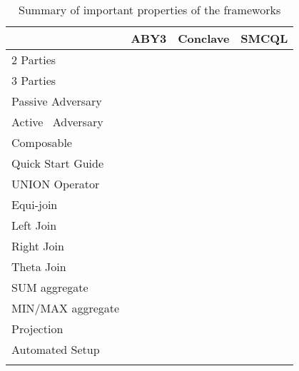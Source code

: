 \begin{table}[H]
	\label{Summary}	
	\centering
	\caption{Summary of important properties of the frameworks}
	\begin{tabular}{|l|l|l|l|} 
		\hline
		& ABY3                 & Conclave             & SMCQL                 \\ 
		\hline
		2 Parties            & \xmark                 & \bluecheck                 & \bluecheck                  \\ 
		\hline
		3 Parties            & \bluecheck                  & \bluecheck                 & \xmark                    \\ 
		\hline
		Passive Adversary    & \bluecheck                & \bluecheck                & \bluecheck                 \\ 
		\hline
		Active~ Adversary    & \xmark                   & \xmark                   & \xmark                    \\ 
		\hline
		Composable           & \bluecheck               & \bluecheck                 & \xmark                    \\ 
		\hline
		Quick Start Guide    & \bluecheck                & \bluecheck                & \xmark                    \\ 
		\hline
		UNION Operator       & \bluecheck                 & \bluecheck                & \bluecheck                  \\ 
		\hline
		Equi-join            & \bluecheck                 & \bluecheck                & \bluecheck                 \\ 
		\hline
		Left Join            & \bluecheck                & \xmark                   & \xmark                    \\ 
		\hline
		Right Join           & \bluecheck                & \xmark                   & \xmark                    \\ 
		\hline
		Theta Join           & \xmark                   & \xmark                   & \bluecheck                  \\ 
		\hline
		SUM aggregate        & \xmark                   & \bluecheck              & \bluecheck                 \\ 
		\hline
		MIN/MAX aggregate    & \xmark                   & \xmark                   & \bluecheck                 \\ 
		\hline
		Projection           & \xmark                  & \bluecheck                 & \bluecheck                \\ 
		\hline
		Automated Setup           & \bluecheck                   & \xmark                  & \xmark                   \\ 
		\hline
		
		\multicolumn{1}{l}{} & \multicolumn{1}{l}{} & \multicolumn{1}{l}{} & \multicolumn{1}{l}{} 
	\end{tabular}
\end{table}

